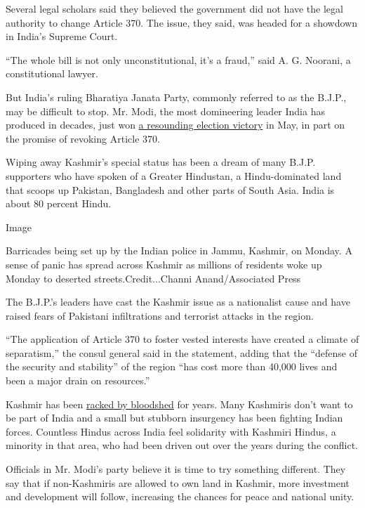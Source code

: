 Several legal scholars said they believed the government did not have
the legal authority to change Article 370. The issue, they said, was
headed for a showdown in India's Supreme Court.

``The whole bill is not only unconstitutional, it's a fraud,'' said A.
G. Noorani, a constitutional lawyer.

But India's ruling Bharatiya Janata Party, commonly referred to as the
B.J.P., may be difficult to stop. Mr. Modi, the most domineering leader
India has produced in decades, just won
\href{https://www.nytimes.com/2019/05/23/world/asia/narendra-modi-election-win.html}{a
resounding election victory} in May, in part on the promise of revoking
Article 370.

Wiping away Kashmir's special status has been a dream of many B.J.P.
supporters who have spoken of a Greater Hindustan, a Hindu-dominated
land that scoops up Pakistan, Bangladesh and other parts of South Asia.
India is about 80 percent Hindu.

Image

Barricades being set up by the Indian police in Jammu, Kashmir, on
Monday. A sense of panic has spread across Kashmir as millions of
residents woke up Monday to deserted streets.Credit...Channi
Anand/Associated Press

The B.J.P.'s leaders have cast the Kashmir issue as a nationalist cause
and have raised fears of Pakistani infiltrations and terrorist attacks
in the region.

``The application of Article 370 to foster vested interests have created
a climate of separatism,'' the consul general said in the statement,
adding that the ``defense of the security and stability'' of the region
``has cost more than 40,000 lives and been a major drain on resources.''

Kashmir has been
\href{https://www.nytimes.com/2018/08/01/world/asia/kashmir-war-india-pakistan.html}{racked
by bloodshed} for years. Many Kashmiris don't want to be part of India
and a small but stubborn insurgency has been fighting Indian forces.
Countless Hindus across India feel solidarity with Kashmiri Hindus, a
minority in that area, who had been driven out over the years during the
conflict.

Officials in Mr. Modi's party believe it is time to try something
different. They say that if non-Kashmiris are allowed to own land in
Kashmir, more investment and development will follow, increasing the
chances for peace and national unity.

